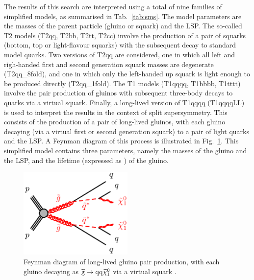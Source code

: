 The results of this search are interpreted using a total of nine families of 
simplified models, as summarised in Tab.~\ref{tab:sms}. The model parameters 
are the masses of the parent particle (gluino or squark) and the LSP. The 
so-called T2 
models (T2qq, T2bb, T2tt, T2cc) involve the production of a pair of squarks 
(bottom, top or light-flavour squarks) with the subsequent decay to standard 
model quarks. Two versions of T2qq are considered, one in which all left and 
righ-handed first and second generation squark 
masses are degenerate (T2qq\_8fold), and one in which only the left-handed up 
squark is light enough to be produced directly (T2qq\_1fold). 
The T1 models (T1qqqq, T1bbbb, T1tttt) involve the pair production of gluinos 
with subsequent three-body decays to quarks via a virtual squark. 
Finally, a long-lived version of T1qqqq (T1qqqqLL) is used to interpret the 
results in the context of split supersymmetry. This consists of the production 
of a pair of long-lived gluinos, with each gluino decaying (via a virtual first 
or second generation squark) to a pair of light quarks and the LSP. 
A Feynman diagram of this process is illustrated in Fig.~\ref{fig:T1qqqqLL}.
This simplified model contains three parameters, namely the masses of the 
gluino and the LSP, and the lifetime (expressed as \ctau) of the gluino.

\begin{figure}
\includegraphics[width=0.5\textwidth]{figs/theory/T1qqqqLL}
\caption{Feynman diagram of long-lived gluino pair production, with each gluino 
decaying as $\mathrm{\widetilde{g}} \rightarrow \mathrm{q}\bar{\mathrm{q}}\widetilde{\chi}_1^0$ via a 
virtual squark \vsquark.}
\label{fig:T1qqqqLL}
\end{figure}

